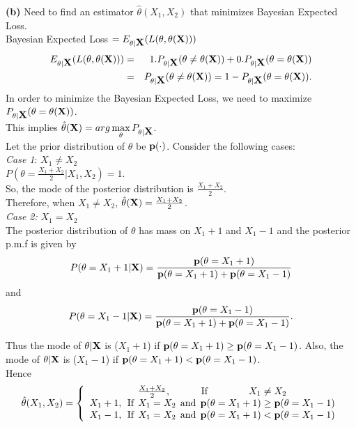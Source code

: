 \noindent
\textbf{(b)} Need to find an estimator $\hat{\theta}(X_1,X_2)$ that minimizes Bayesian Expected Loss. \\

\noindent
Bayesian Expected Loss $=E_{\theta|\hbox{\bf X}}(L(\theta,\theta(\hbox{\bf X})))$
\begin{eqnarray}
E_{\theta|\hbox{\bf X}}(L(\theta,\theta(\hbox{\bf X}))) &=& 1. P_{\theta|\hbox{\bf X}}(\theta\neq \theta(\hbox{\bf X}))+0. P_{\theta|\hbox{\bf X}}(\theta=\theta(\hbox{\bf X}))\\
&=& P_{\theta|\hbox{\bf X}}(\theta\neq \theta(\hbox{\bf X}))=1-P_{\theta|\hbox{\bf X}}(\theta=\theta(\hbox{\bf X})).
\end{eqnarray}
In order to minimize the Bayesian Expected Loss, we need to maximize \\
$P_{\theta|\hbox{\bf X}}(\theta=\theta(\hbox{\bf X}))$. \\
This implies
$\hat{\theta}(\hbox{\bf X})=arg\max\limits_{\theta} P_{\theta|\hbox{\bf X}}$. \\

Let the prior distribution of $\theta$ be $\hbox{\bf p}(\cdot)$. 
Consider the following cases:\\

\emph{Case 1}: $X_1\neq X_2$ \\

$P(\theta=\frac{X_1+X_2}{2}|X_1,X_2)=1$. \\So, the mode of the posterior distribution is $\frac{X_1+X_2}{2}$. \\Therefore, when $X_1\neq X_2$, $\hat{\theta}(\hbox{\bf X})=\frac{X_1+X_2}{2}$. \\

\emph{Case 2:} $X_1=X_2$\\

The posterior distribution of $\theta$ has mass on $X_1+1$ and $X_1-1$ and the posterior p.m.f is given by
\begin{equation}
P(\theta=X_1+1|\hbox{\bf X})=\frac{\hbox{\bf p}(\theta=X_1+1)}{\hbox{\bf p}(\theta=X_1+1)+\hbox{\bf p}(\theta=X_1-1)}
\end{equation}
and 
\begin{equation}
P(\theta=X_1-1|\hbox{\bf X})=\frac{\hbox{\bf p}(\theta=X_1-1)}{\hbox{\bf p}(\theta=X_1+1)+\hbox{\bf p}(\theta=X_1-1)}.
\end{equation}


Thus the mode of $\theta|\hbox{\bf X}$ is ($X_1+1$) if $\hbox{\bf p}(\theta=X_1+1)\geq \hbox{\bf p}(\theta=X_1-1)$. Also, the mode of $\theta|\hbox{\bf X}$ is ($X_1-1$) if $\hbox{\bf p}(\theta=X_1+1) < \hbox{\bf p}(\theta=X_1-1)$. \\
Hence
$$
\hat{\theta}(X_1,X_2)=\left\{\begin{array}{c}
\frac{X_1+X_2}{2}, \:\:\:\:\:\:\:\:\:\:\:\:\:\:\mbox{If}\:\:\:\:\:\:\:\:\:\:\:\:\:\:\:\:\:\:\:X_1\neq X_2\\
X_1+1,\:\:\mbox{If}\:\:X_1=X_2\:\:\mbox{and}\:\:\hbox{\bf p}(\theta=X_1+1)\geq \hbox{\bf p}(\theta=X_1-1)\\
X_1-1,\:\:\mbox{If}\:\:X_1=X_2\:\:\mbox{and}\:\:\hbox{\bf p}(\theta=X_1+1)<\hbox{\bf p}(\theta=X_1-1)\\
\end{array}
\right.
$$
